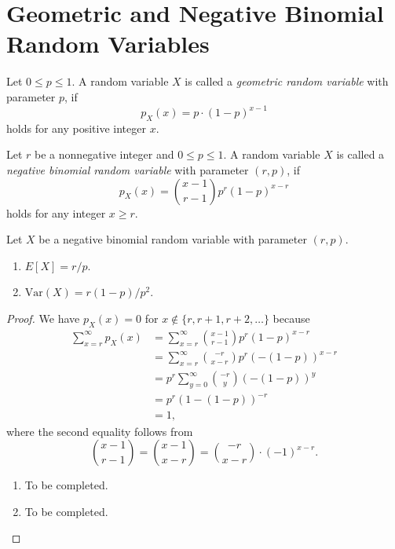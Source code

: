 \section{Geometric and Negative Binomial Random Variables}
\begin{definition}
  Let $0 \leq p \leq 1$.
  A random variable $X$ is called a \emph{geometric random variable}
  with parameter $p$, if
  \begin{equation*}
    p_X(x) = p \cdot (1-p)^{x-1}
  \end{equation*}
  holds for any positive integer $x$.
\end{definition}

\begin{definition}
  Let $r$ be a nonnegative integer and $0 \leq p \leq 1$.
  A random variable $X$ is called a \emph{negative binomial random variable}
  with parameter $(r, p)$, if
  \begin{equation*}
    p_X(x) = \binom{x-1}{r-1}p^r(1-p)^{x-r}
  \end{equation*}
  holds for any integer $x \geq r$.
\end{definition}

\begin{theorem}
  Let $X$ be a negative binomial random variable with parameter $(r, p)$.
  \begin{enumerate}
    \item $E[X] = r/p$.
    \item $\mathrm{Var}(X) = r(1-p)/p^2$.
  \end{enumerate}
\end{theorem}
\begin{proof}
  We have $p_X(x) = 0$ for $x \notin \{r, r+1, r+2, \dots\}$ because
  \begin{align*}
    \sum_{x=r}^\infty p_X(x)
    &= \sum_{x=r}^\infty \binom{x-1}{r-1} p^r (1-p)^{x-r} \\
    &= \sum_{x=r}^\infty \binom{-r}{x-r} p^r (-(1-p))^{x-r} \\
    &= p^r \sum_{y=0}^\infty \binom{-r}{y} (-(1-p))^y \\
    &= p^r (1-(1-p))^{-r} \\
    &= 1,
  \end{align*}
  where the second equality follows from
  \begin{equation*}
    \binom{x-1}{r-1}
    = \binom{x-1}{x-r}
    = \binom{-r}{x-r} \cdot (-1)^{x-r}.
  \end{equation*}
  \begin{enumerate}
    \item To be completed.
    \item To be completed. \qedhere
  \end{enumerate}
\end{proof}

